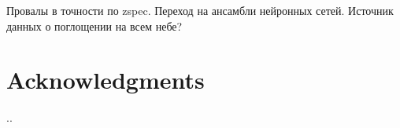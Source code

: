 \documentclass[fleqn,usenatbib]{mnras}
\begin{document}
Провалы в точности по zspec. Переход на ансамбли нейронных сетей. Источник данных о поглощении на всем небе?

\clearpage

\section*{Acknowledgments}
..




\appendix

%
%
%
%
%
%
%
%
%
\end{document}

